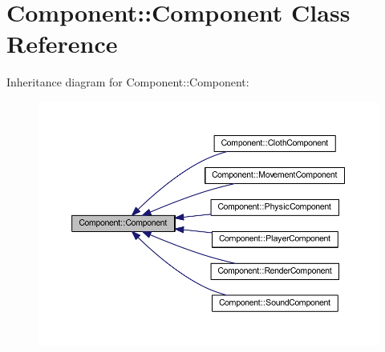\hypertarget{class_component_1_1_component}{}\section{Component\+:\+:Component Class Reference}
\label{class_component_1_1_component}


Inheritance diagram for Component\+:\+:Component\+:
\nopagebreak
\begin{figure}[H]
\begin{center}
\leavevmode
\includegraphics[width=350pt]{class_component_1_1_component__inherit__graph}
\end{center}
\end{figure}
